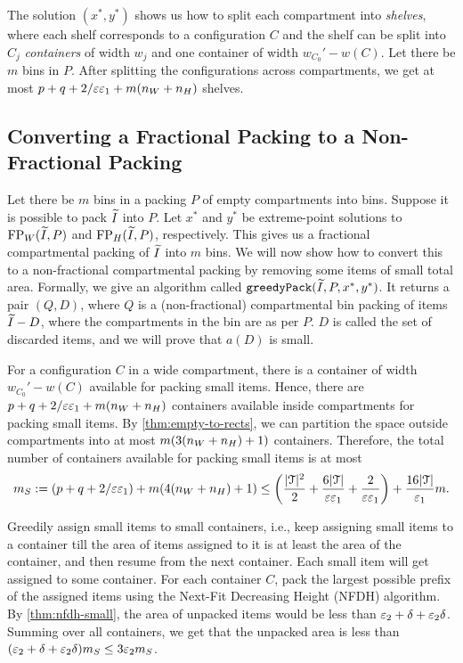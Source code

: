 The solution $(x^*, y^*)$ shows us how to split each compartment into \emph{shelves},
where each shelf corresponds to a configuration $C$
and the shelf can be split into $C_j$ \emph{containers} of width $w_j$
and one container of width $w_{C_0}' - w(C)$.
Let there be $m$ bins in $P$. After splitting the configurations across compartments,
we get at most $p + q + 2/\varepsilon\varepsilon_1 + m(n_W + n_H)$ shelves.

\subsection{Converting a Fractional Packing to a Non-Fractional Packing}
\label{sec:greedy-cont}

Let there be $m$ bins in a packing $P$ of empty compartments into bins.
Suppose it is possible to pack $\widetilde{I}$ into $P$.
Let $x^*$ and $y^*$ be extreme-point solutions to
$\operatorname{FP}_W(\widetilde{I}, P)$ and $\operatorname{FP}_H(\widetilde{I}, P)$, respectively.
This gives us a fractional compartmental packing of $\widetilde{I}$ into $m$ bins.
We will now show how to convert this to a non-fractional compartmental packing
by removing some items of small total area.
Formally, we give an algorithm called $\operatorname{\mathtt{greedyPack}}(\widetilde{I}, P, x^*, y^*)$.
It returns a pair $(Q, D)$, where $Q$ is a (non-fractional) compartmental
bin packing of items $\widetilde{I} - D$, where the compartments in the bin are as per $P$.
$D$ is called the set of discarded items, and we will prove that $a(D)$ is small.

For a configuration $C$ in a wide compartment, there is a container
of width $w_{C_0}' - w(C)$ available for packing small items.
Hence, there are $p + q + 2/\varepsilon\varepsilon_1 + m(n_W + n_H)$ containers available
inside compartments for packing small items.
By \cref{thm:empty-to-rects}, we can partition the space outside compartments into
at most $m(3(n_W + n_H) + 1)$ containers.
Therefore, the total number of containers available for packing small items is at most
\[ m_S := (p + q + 2/\varepsilon\varepsilon_1) + m(4(n_W + n_H) + 1)
\le \left(\frac{|\mathcal{T}|^2}{2} + \frac{6|\mathcal{T}|}{\varepsilon\varepsilon_1}
    + \frac{2}{\varepsilon\varepsilon_1}\right) + \frac{16|\mathcal{T}|}{\varepsilon_1} m. \]

Greedily assign small items to small containers, i.e., keep assigning small items
to a container till the area of items assigned to it is at least
the area of the container, and then resume from the next container.
Each small item will get assigned to some container.
For each container $C$, pack the largest possible prefix of the assigned items using
the Next-Fit Decreasing Height (NFDH) algorithm.
By \cref{thm:nfdh-small}, the area of unpacked items would be
less than $\varepsilon_2 + \delta + \varepsilon_2\delta$. Summing over all containers,
we get that the unpacked area is less than
$(\varepsilon_2 + \delta + \varepsilon_2\delta)m_S \le 3\varepsilon_2 m_S$.


